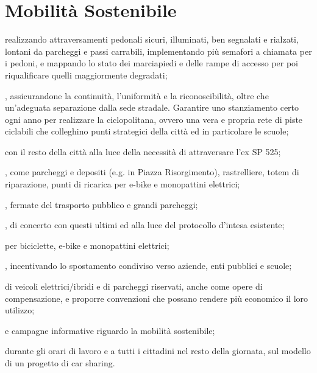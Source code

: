 \section{Mobilità Sostenibile}
 realizzando attraversamenti pedonali sicuri, illuminati, ben segnalati e rialzati, lontani da parcheggi e passi carrabili, implementando più semafori a chiamata per i pedoni, e mappando lo stato dei marciapiedi e delle rampe di accesso per poi riqualificare quelli maggiormente degradati;

, assicurandone la continuità, l'uniformità e la riconoscibilità, oltre che un'adeguata separazione dalla sede stradale. Garantire uno stanziamento certo ogni anno per realizzare la ciclopolitana, ovvero una vera e propria rete di piste ciclabili che colleghino punti strategici della città ed in particolare le scuole;

 con il resto della città alla luce della necessità di attraversare l'ex SP 525;

, come parcheggi e depositi (e.g. in Piazza Risorgimento), rastrelliere, totem di riparazione, punti di ricarica per e-bike e monopattini elettrici;

, fermate del trasporto pubblico e grandi parcheggi;

, di concerto con questi ultimi ed alla luce del protocollo d'intesa esistente;

 per biciclette, e-bike e monopattini elettrici;

, incentivando lo spostamento condiviso verso aziende, enti pubblici e scuole;

 di veicoli elettrici/ibridi e di parcheggi riservati, anche come opere di compensazione, e proporre convenzioni che possano rendere più economico il loro utilizzo; 

 e campagne informative riguardo la mobilità sostenibile;

 durante gli orari di lavoro e a tutti i cittadini nel resto della giornata, sul modello di un progetto di car sharing.
